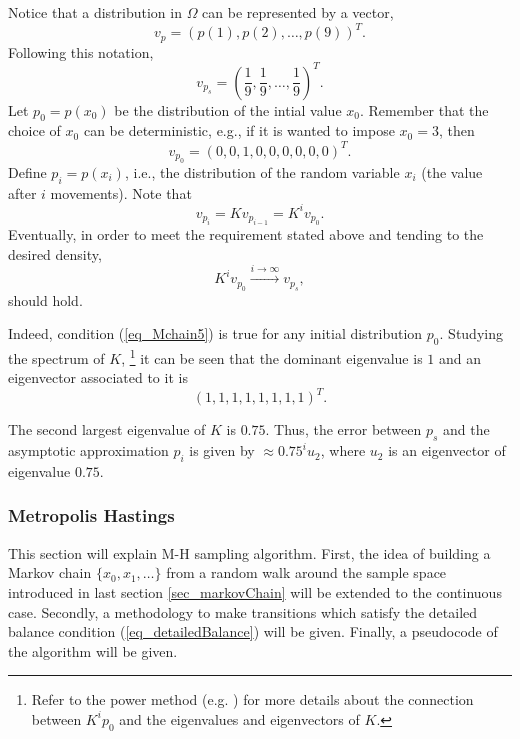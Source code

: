 Notice that a distribution in $\Omega$ can be represented by a vector,
$$
  v_p = \left( p(1), p(2), \dots, p(9) \right)^T.
$$
Following this notation,
$$
  v_{p_s} = \left(\frac{1}{9}, \frac{1}{9}, \dots, \frac{1}{9}\right)^T.
$$
Let $p_0 = p(x_0)$ be the distribution of the intial value $x_0$. 
Remember that the choice of $x_0$ can be deterministic, e.g., if it is wanted to impose $x_0 = 3$, then
$$
  v_{p_0} = (0,0,1,0,0,0,0,0,0)^T.
$$
Define $p_i = p(x_i)$, i.e., the distribution of the random variable $x_i$ (the value after $i$ movements).
Note that 
$$
  v_{p_{i}} = Kv_{p_{i-1}} = K^i v_{p_0}.
$$
Eventually, in order to meet the requirement stated above and tending to the desired density, 
\begin{equation} \label{eq_Mchain5}
  K^i v_{p_0} \xrightarrow{i \to \infty} v_{p_s},
\end{equation}
should hold.

\begin{remark}
Indeed, condition (\ref{eq_Mchain5}) is true for any initial distribution $p_0$. Studying the spectrum of $K$,
\footnote{Refer to the power method (e.g. \cite{golub2013}) for more details about the connection between $K^i p_0$ and the eigenvalues and eigenvectors of $K$.}
it can be seen that the dominant eigenvalue is $1$ and an eigenvector associated to it is
$$
  (1,1,1,1,1,1,1,1)^T.  
$$ 
\end{remark}

\begin{remark}
  The second largest eigenvalue of $K$ is $0.75$. Thus, the error between $p_s$ and the asymptotic approximation $p_i$ is given by $\approx 0.75^i u_2$, where $u_2$ is an eigenvector of eigenvalue $0.75$.
\end{remark}

\subsubsection{Metropolis Hastings} \label{sec_MetropolisHastings}

This section will explain M-H sampling algorithm. First, the idea of building a Markov chain $\{x_0,x_1,\dots\}$ from a random walk around the sample space introduced in last section \ref{sec_markovChain} will be extended to the continuous case. Secondly, a methodology to make transitions which satisfy the detailed balance condition (\ref{eq_detailedBalance}) will be given. Finally, a pseudocode of the algorithm will be given.

